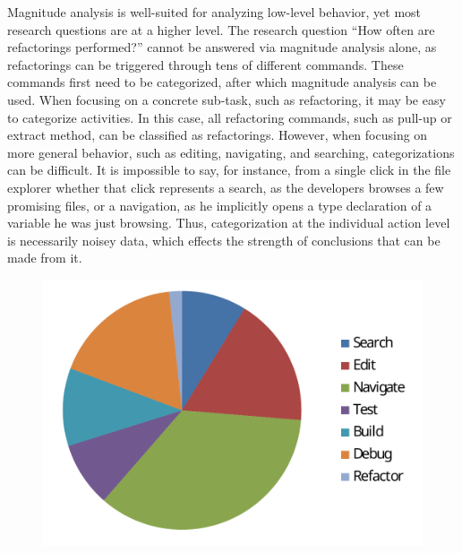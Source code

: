Magnitude analysis is well-suited for analyzing low-level behavior, yet most research questions are at a higher level. The research question ``How often are refactorings performed?'' cannot be answered via magnitude analysis alone, as refactorings can be triggered through tens of different commands. These commands first need to be categorized, after which magnitude analysis can be used. When focusing on a concrete sub-task, such as refactoring, it may be easy to categorize activities. In this case, all refactoring commands, such as pull-up or extract method, can be classified as refactorings. However, when focusing on more general behavior, such as editing, navigating, and searching, categorizations can be difficult. It is impossible to say, for instance, from a single click in the file explorer whether that click represents a search, as the developers browses a few promising files, or a navigation, as he implicitly opens a type declaration of a variable he was just browsing. Thus, categorization at the individual action level is necessarily noisey data, which effects the strength of conclusions that can be made from it.

\begin{figure}[t]
 \centering
\includegraphics[width=0.5\columnwidth]{../Graphics/activityCategorization.pdf}
\label{fig:category}
\end{figure}